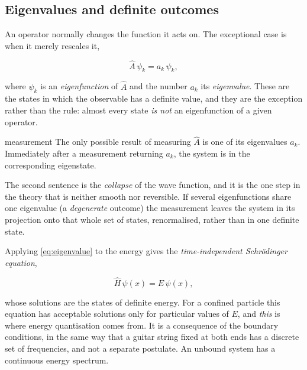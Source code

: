     \subsection{Eigenvalues and definite outcomes}

        An operator normally changes the function it acts on. The exceptional case is when it merely rescales it,

        \begin{equation}\label{eq:eigenvalue}
            \hat{A}\,\psi_{k} = a_{k}\,\psi_{k},
        \end{equation}

        where $\psi_{k}$ is an \emph{eigenfunction} of $\hat{A}$ and the number $a_{k}$ its \emph{eigenvalue}. These are the states in which the observable has a definite value, and they are the exception rather than the rule: almost every state \emph{is not} an eigenfunction of a given operator.

        \begin{postulate}{measurement}
            The only possible result of measuring $\hat{A}$ is one of its eigenvalues $a_{k}$. Immediately after a measurement returning $a_{k}$, the system is in the corresponding eigenstate.
        \end{postulate}

        The second sentence is the \emph{collapse} of the wave function, and it is the one step in the theory that is neither smooth nor reversible. If several eigenfunctions share one eigenvalue (a \emph{degenerate} outcome) the measurement leaves the system in its projection onto that whole set of states, renormalised, rather than in one definite state.

        Applying \cref{eq:eigenvalue} to the energy gives the \emph{time-independent Schrödinger equation},

        \begin{equation}\label{eq:tise}
            \hat{H}\,\psi(x) = E\,\psi(x),
        \end{equation}

        whose solutions are the states of definite energy. For a confined particle this equation has acceptable solutions only for particular values of $E$, and \emph{this} is where energy quantisation comes from. It is a consequence of the boundary conditions, in the same way that a guitar string fixed at both ends has a discrete set of frequencies, and not a separate postulate. An unbound system has a continuous energy spectrum.

